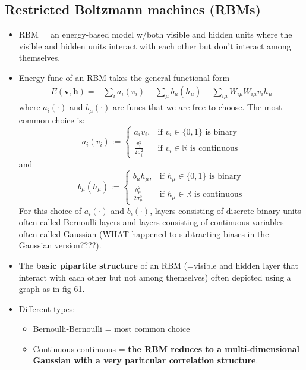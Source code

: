 \documentclass[norsk,a4paper,11pt]{article}
\begin{document}
\subsection{Restricted Boltzmann machines (RBMs)}
\begin{itemize}
	\item RBM = an energy-based model w/both visible and hidden units where the visible and hidden units interact with each other but don't interact among themselves. 
	\item Energy func of an RBM takes the general functional form
	\begin{align}
		E(\bm{v}, \bm{h}) = -\sum_i a_i(v_i) - \sum_\mu b_\mu (h_\mu) - \sum_{i\mu} W_{i\mu} W_{i\mu} v_i h_\mu
	\end{align}
	where $a_i(\cdot)$ and $b_\mu(\cdot)$ are funcs that we are free to choose. The most common choice is:
	\begin{equation}
        a_i(v_i):=
        \begin{cases}
            a_i v_i,    &\text{if $v_i \in \{ 0,1 \}$ is binary} \\
            \frac{v_i^2}{2 \sigma_i^2} &\text{if $v_i \in \mathbb{R}$ is continuous}
        \end{cases}
    \end{equation}
    and 
    \begin{equation}
        b_\mu(h_\mu):=
        \begin{cases}
            b_\mu h_\mu,    &\text{if $h_\mu \in \{ 0,1 \}$ is binary} \\
            \frac{h_\mu^2}{2 \sigma_\mu^2} &\text{if $h_\mu \in \mathbb{R}$ is continuous}
        \end{cases}
    \end{equation}
	For this choice of $a_i(\cdot)$ and $b_i(\cdot)$, layers consisting of discrete binary units often called Bernoulli layers and layers consisting of continuous variables often called Gaussian (WHAT happened to subtracting biases in the Gaussian version????).
	\item The \textbf{basic pipartite structure} of an RBM (=visible and hidden layer that interact with each other but not among themselves) often depicted using a graph as in fig 61.
	\item Different types:
	\begin{itemize}
		\item Bernoulli-Bernoulli = most common choice
		\item Continuous-continuous = \textbf{the RBM reduces to a multi-dimensional Gaussian with a very paritcular correlation structure}.

\end{itemize}
\end{itemize}
\end{document}
